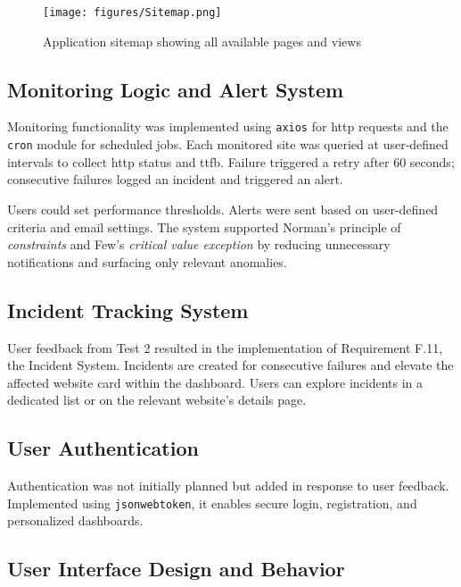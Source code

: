 \begin{figure}[H]
        \centering
        \texttt{[image: figures/Sitemap.png]}
        \caption{Application sitemap showing all available pages and views}
        \label{fig:sitemap}
\end{figure}

\subsection{Monitoring Logic and Alert System}
\label{subsec:monitoring_logic_results}

Monitoring functionality was implemented using \texttt{axios} for \gls{http} requests and the \texttt{cron} module for scheduled jobs. Each monitored site was queried at user-defined intervals to collect \gls{http} status and \acrfull{ttfb}. Failure triggered a retry after 60 seconds; consecutive failures logged an incident and triggered an alert.

Users could set performance thresholds. Alerts were sent based on user-defined criteria and email settings. The system supported Norman’s principle of \textit{constraints} and Few’s \textit{critical value exception} by reducing unnecessary notifications and surfacing only relevant anomalies.

\subsection{Incident Tracking System}
\label{subsec:incident_tracking_results}

User feedback from Test 2 resulted in the implementation of Requirement F.11, the Incident System. Incidents are created for consecutive failures and elevate the affected website card within the dashboard. Users can explore incidents in a dedicated list or on the relevant website’s details page.

\subsection{User Authentication}
\label{subsec:user_authentication_results}

Authentication was not initially planned but added in response to user feedback. Implemented using \texttt{jsonwebtoken}, it enables secure login, registration, and personalized dashboards.

\subsection{User Interface Design and Behavior}

